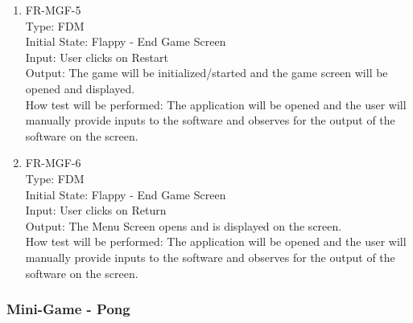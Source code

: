 \documentclass[12pt, titlepage]{article}
\begin{document}
\begin{enumerate}
\item{FR-MGF-5\\}
Type: FDM\\
Initial State: Flappy - End Game Screen\\
Input: User clicks on Restart\\
Output: The game will be initialized/started and the game screen will be opened and displayed.\\
How test will be performed: The application will be opened and the user will manually provide inputs to the software and observes for the output of the software on the screen.\\

\item{FR-MGF-6\\}
Type: FDM\\
Initial State: Flappy - End Game Screen\\
Input: User clicks on Return\\
Output: The Menu Screen opens and is displayed on the screen.\\
How test will be performed: The application will be opened and the user will manually provide inputs to the software and observes for the output of the software on the screen.\\
    
\end{enumerate}

\subsubsection{Mini-Game - Pong}
\end{document}
